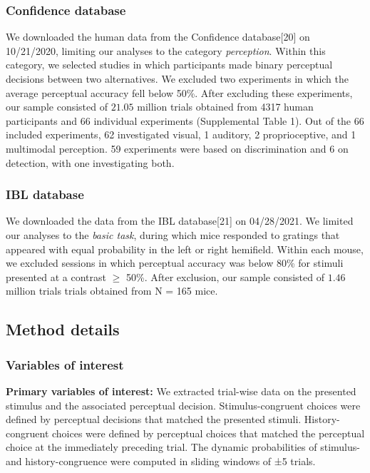 \documentclass[
]{article}
\begin{document}
\hypertarget{confidence-database}{%
\subsubsection{Confidence database}\label{confidence-database}}

We downloaded the human data from the Confidence database{[}20{]} on
10/21/2020, limiting our analyses to the category \emph{perception}.
Within this category, we selected studies in which participants made
binary perceptual decisions between two alternatives. We excluded two
experiments in which the average perceptual accuracy fell below 50\%.
After excluding these experiments, our sample consisted of \(21.05\)
million trials obtained from 4317 human participants and 66 individual
experiments (Supplemental Table 1). Out of the 66 included experiments,
62 investigated visual, 1 auditory, 2 proprioceptive, and 1 multimodal
perception. 59 experiments were based on discrimination and 6 on
detection, with one investigating both.

\hypertarget{ibl-database}{%
\subsubsection{IBL database}\label{ibl-database}}

We downloaded the data from the IBL database{[}21{]} on 04/28/2021. We
limited our analyses to the \emph{basic task}, during which mice
responded to gratings that appeared with equal probability in the left
or right hemifield. Within each mouse, we excluded sessions in which
perceptual accuracy was below 80\% for stimuli presented at a contrast
\(\geq\) 50\%. After exclusion, our sample consisted of \(1.46\) million
trials trials obtained from N = 165 mice.

\hypertarget{method-details}{%
\subsection{Method details}\label{method-details}}

\hypertarget{variables-of-interest}{%
\subsubsection{Variables of interest}\label{variables-of-interest}}

\textbf{Primary variables of interest:} We extracted trial-wise data on
the presented stimulus and the associated perceptual decision.
Stimulus-congruent choices were defined by perceptual decisions that
matched the presented stimuli. History-congruent choices were defined by
perceptual choices that matched the perceptual choice at the immediately
preceding trial. The dynamic probabilities of stimulus- and
history-congruence were computed in sliding windows of ±5 trials.
\end{document}
